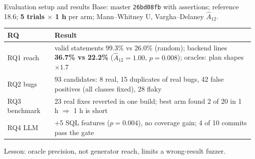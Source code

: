 \documentclass[aspectratio=169,10pt]{beamer}
\begin{document}
\begin{frame}{Evaluation setup and results}
\small
Base: master \texttt{26bd08fb} with assertions; reference 18.6; \textbf{5 trials $\times$ 1 h} per arm; Mann--Whitney U, Vargha--Delaney $\hat A_{12}$.

\medskip
\begin{tabularx}{\linewidth}{@{}lX@{}}
\toprule
RQ & Result \\
\midrule
RQ1 reach & valid statements 99.3\% vs 26.0\% (random); backend lines \textbf{36.7\% vs 22.2\%} ($\hat A_{12}=1.00$, $p=0.008$); oracles: plan shapes $\times1.7$ \\
RQ2 bugs & 93 candidates: 8 real, 15 duplicates of real bugs, 42 false positives (all classes fixed), 28 flaky \\
RQ3 benchmark & 23 real fixes reverted in one build; best arm found 2 of 20 in 1 h $\Rightarrow$ 1 h is short \\
RQ4 LLM & +5 SQL features ($p=0.004$), no coverage gain; 4 of 10 commits pass the gate \\
\bottomrule
\end{tabularx}

\medskip
Lesson: \alert{oracle precision}, not generator reach, limits a wrong-result fuzzer.
\end{frame}
\end{document}
